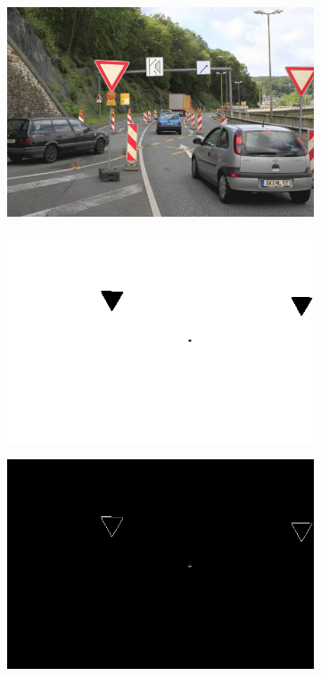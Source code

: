 \documentclass{report}
\begin{document}
\begin{figure}
  \begin{subfigure}[t]{0.316\textwidth}
    \includegraphics[width=1\textwidth, frame]{src/edges/original}
  \end{subfigure}
  \quad
  \begin{subfigure}[t]{0.316\textwidth}
    \includegraphics[width=1\textwidth, frame]{src/edges/filled}
  \end{subfigure}
  \quad
  \begin{subfigure}[t]{0.316\textwidth}
    \includegraphics[width=1\textwidth, frame]{src/edges/edged}

\end{subfigure}
\end{figure}
\end{document}
